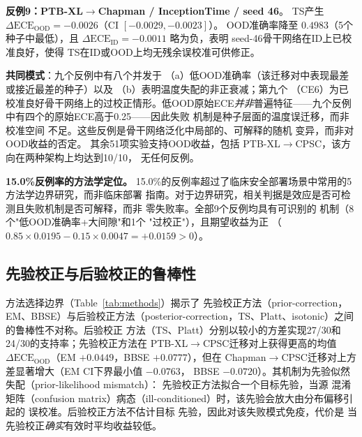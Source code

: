 \textbf{反例9：PTB-XL$\rightarrow$Chapman / InceptionTime / seed 46}。
TS产生 $\Delta\text{ECE}_{\text{OOD}}=-0.0026$（CI $[-0.0029, -0.0023]$）。
OOD准确率降至 $0.4983$（5个种子中最低），且
$\Delta\text{ECE}_{\text{ID}}=-0.0011$ 略为负，表明
seed-46骨干网络在ID上已校准良好，使得
TS在ID或OOD上均无残余误校准可供修正。

\textbf{共同模式}：九个反例中有八个并发于
（a）低OOD准确率（该迁移对中表现最差或接近最差的种子）以及
（b）表明温度失配的非正衰减；第九个
（CE6）为已校准良好骨干网络上的过校正情形。低OOD原始ECE\emph{并非}普遍特征——九个反例中有四个的原始ECE高于0.25——因此失败
机制是种子层面的温度误迁移，而非校准空间
不足。这些反例是骨干网络泛化中局部的、可解释的随机
变异，而非对OOD收益的否定。
其余51项实验支持OOD收益，包括
PTB-XL$\rightarrow$CPSC，该方向在两种架构上均达到10/10，
无任何反例。

\textbf{15.0\%反例率的方法学定位。}
15.0\%的反例率超过了临床安全部署场景中常用的5%
方法学边界研究，而非临床部署
指南。对于边界研究，相关判据是效应是否可检测且失败机制是否可解释，而非
零失败率。全部9个反例均具有可识别的
机制（8个"低OOD准确率+大间隙"和1个
"过校正"），且期望收益为正
（$0.85 \times 0.0195 - 0.15 \times 0.0047 = +0.0159 > 0$）。

\subsection{先验校正与后验校正的鲁棒性}
方法选择边界（Table~\ref{tab:methods}）揭示了
先验校正方法（prior-correction，EM、BBSE）与后验校正方法（posterior-correction，TS、Platt、isotonic）之间的鲁棒性不对称。后验校正
方法（TS、Platt）分别以较小的方差实现27/30和24/30的支持率；先验校正方法在
PTB-XL$\rightarrow$CPSC迁移对上获得更高的均值
$\Delta\text{ECE}_{\text{OOD}}$（EM $+0.0449$，BBSE $+0.0777$），但在
Chapman$\rightarrow$CPSC迁移对上方差显著增大（EM CI下界最小值 $-0.0763$，
BBSE $-0.0720$）。其机制为先验似然失配（prior-likelihood mismatch）：
先验校正方法拟合一个目标先验，当源
混淆矩阵（confusion matrix）病态（ill-conditioned）时，该先验会放大由分布偏移引起的
误校准。后验校正方法不估计目标
先验，因此对该失败模式免疫，代价是
当先验校正\emph{确实}有效时平均收益较低。

